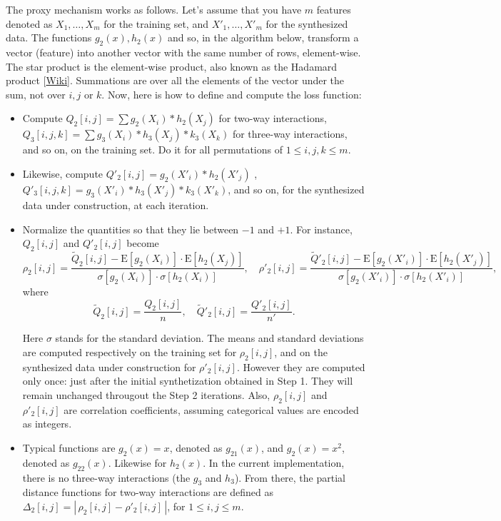 \documentclass[oneside,10pt]{book}
\begin{document}
The proxy mechanism works as follows. Let's assume that you have $m$ features denoted as $X_1,\dots, X_m$ for the training set,
 and $X'_1,\dots, X'_m$ for the synthesized data. The functions $g_2(x), h_2(x)$ and so, in the algorithm below,  transform a vector (feature) into another vector with the same number of rows, element-wise. The star product is the element-wise product, also known as the
\textcolor{index}{Hadamard product} [\href{https://en.wikipedia.org/wiki/Hadamard_product_(matrices)}{Wiki}].  Summations are over all the elements of the vector under the sum, not over $i,j$ or $k$. Now, here is how to define and compute the loss function:
\vspace{1ex}
\begin{itemize}
\item Compute
  $Q_2[i,j] = \sum g_2(X_i) * h_2(X_j)$ for two-way interactions,  $Q_3[i,j,k] = \sum g_3(X_i)* h_3(X_j) * k_3(X_k)$ for three-way interactions, and so on, on the training set. Do it for all permutations of $1\leq i, j, k\leq m$.
\item Likewise, compute  $Q'_2[i,j] = g_2(X'_i) * h_2(X'_j)$ , $Q'_3[i,j,k] = g_3(X'_i) * h_3(X'_j) * k_3(X'_k)$, and so on, for the synthesized data under construction, at each iteration.
\item Normalize the quantities so that they lie between $-1$ and $+1$. For instance, $Q_2[i,j]$ and $Q'_2[i,j]$ become
$$\rho_2[i, j] = \frac{\widetilde{Q}_2[i,j] - \text{E}[g_2(X_i)]\cdot \text{E}[h_2(X_j)]}{\sigma[g_2(X_i)] \cdot \sigma[h_2(X_i)]},\quad
\rho'_2[i, j] = \frac{\widetilde{Q}'_2[i, j] - \text{E}[g_2(X'_i)]\cdot \text{E}[h_2(X'_j)]}{\sigma[g_2(X'_i)] \cdot \sigma[h_2(X'_i)]},$$
where $$\widetilde{Q}_2[i, j] = \frac{Q_2[i, j]}{n}, \quad \widetilde{Q}'_2[i, j] = \frac{Q'_2[i, j]}{n'}.$$

\noindent Here $\sigma$ stands for the standard deviation. The means and standard deviations are computed respectively on the training set for $\rho_2[i,j]$, and on the synthesized data under construction for $\rho'_2[i,j]$. However they are computed only once: just after the initial synthetization obtained in Step 1. They will remain unchanged througout the Step 2 iterations. Also, $\rho_2[i,j]$ and $\rho'_2[i,j]$ are correlation coefficients, assuming categorical values are encoded as integers.
\item Typical functions are $g_2(x) = x$, denoted as $g_{21}(x)$, and $g_2(x) = x^2$, denoted as $g_{22}(x)$. Likewise for $h_2(x)$. In the current implementation,
 there is no three-way interactions (the $g_3$ and $h_3$).
From there, the partial distance functions for two-way interactions are defined as $\Delta_2[i,j] = |\,\rho_2[i, j] - \rho'_2[i, j]\,|$, for $1\leq i, j\leq m$.


\end{itemize}
\end{document}
